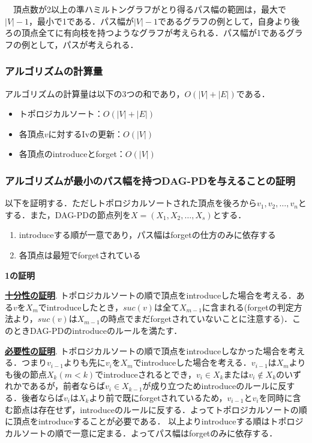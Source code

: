 \documentclass{kuisthesis}           %
\begin{document}
　頂点数が2以上の準ハミルトングラフがとり得るパス幅の範囲は，最大で$|V|-1$，最小で1である．パス幅が$|V|-1$であるグラフの例として，自身より後ろの頂点全てに有向枝を持つようなグラフが考えられる．パス幅が1であるグラフの例として，パスが考えられる．

 \subsubsection{アルゴリズムの計算量}

 アルゴリズムの計算量は以下の3つの和であり，$O(|V|+|E|)$である．

 \begin{itemize}
     \item トポロジカルソート：$O(|V|+|E|)$
     \item 各頂点$v$に対するIvの更新：$O(|V|)$
     \item 各頂点のintroduceとforget：$O(|V|)$
 \end{itemize}
 
 \subsubsection{アルゴリズムが最小のパス幅を持つDAG-PDを与えることの証明}
 以下を証明する．ただしトポロジカルソートされた頂点を後ろから$v_1, v_2,   \ldots, v_n$とする．また，DAG-PDの節点列を$X=(X_1, X_2,   \ldots, X_s)$とする．
 
 \begin{enumerate}
 \item introduceする順が一意であり，パス幅はforgetの仕方のみに依存する
 \item 各頂点は最短でforgetされている
 \end{enumerate}

 \textbf{1の証明}
 
 \textbf{\underline{十分性の証明}}.
 トポロジカルソートの順で頂点をintroduceした場合を考える．ある$v$を$X_m$でintroduceしたとき，$suc(v)$は全て$X_{m-1}$に含まれる(forgetの判定方法より，$suc(v)$は$X_{m-1}$の時点でまだforgetされていないことに注意する)．このときDAG-PDのintroduceのルールを満たす．

 \textbf{\underline{必要性の証明}}.
 トポロジカルソートの順で頂点をintroduceしなかった場合を考える．つまり$v_{i-1}$よりも先に$v_i$を$X_m$でintroduceした場合を考える．$v_{i-1}$は$X_m$よりも後の節点$X_k(m<k)$でintroduceされるとでき，$v_i \in X_k$または$v_i \notin X_k$のいずれかであるが，前者ならば$v_i \in X_{k-1}$が成り立つためintroduceのルールに反する．後者ならば$v_i$は$X_k$より前で既にforgetされているため，$v_{i-1}$と$v_i$を同時に含む節点は存在せず，introduceのルールに反する．よってトポロジカルソートの順に頂点をintroduceすることが必要である．
 以上よりintroduceする順はトポロジカルソートの順で一意に定まる．よってパス幅はforgetのみに依存する．
\end{document}
